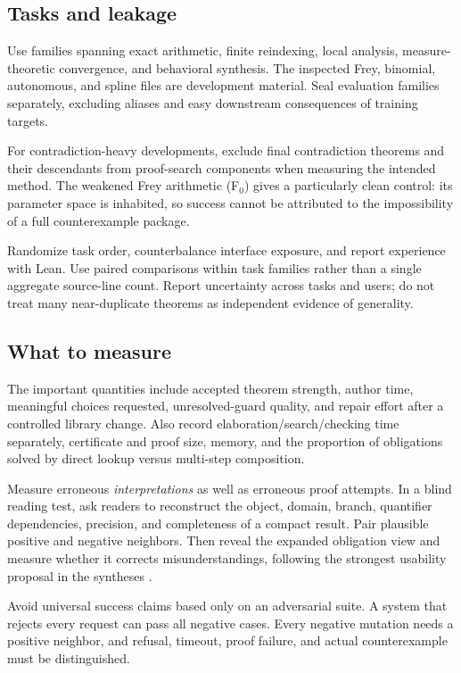 \documentclass[11pt,letterpaper]{article}
\theoremstyle{definition}\newtheorem{definition}[theorem]{Definition}
\begin{document}
\subsection{Tasks and leakage}
Use families spanning exact arithmetic, finite reindexing, local analysis, measure-theoretic convergence, and behavioral synthesis. The inspected Frey, binomial, autonomous, and spline files are development material. Seal evaluation families separately, excluding aliases and easy downstream consequences of training targets.

For contradiction-heavy developments, exclude final contradiction theorems and their descendants from proof-search components when measuring the intended method. The weakened Frey arithmetic (F$_0$) gives a particularly clean control: its parameter space is inhabited, so success cannot be attributed to the impossibility of a full counterexample package.

Randomize task order, counterbalance interface exposure, and report experience with Lean. Use paired comparisons within task families rather than a single aggregate source-line count. Report uncertainty across tasks and users; do not treat many near-duplicate theorems as independent evidence of generality.

\subsection{What to measure}
The important quantities include accepted theorem strength, author time, meaningful choices requested, unresolved-guard quality, and repair effort after a controlled library change. Also record elaboration/search/checking time separately, certificate and proof size, memory, and the proportion of obligations solved by direct lookup versus multi-step composition.

Measure erroneous \emph{interpretations} as well as erroneous proof attempts. In a blind reading test, ask readers to reconstruct the object, domain, branch, quantifier dependencies, precision, and completeness of a compact result. Pair plausible positive and negative neighbors. Then reveal the expanded obligation view and measure whether it corrects misunderstandings, following the strongest usability proposal in the syntheses \cite{reportA,reportB}.

Avoid universal success claims based only on an adversarial suite. A system that rejects every request can pass all negative cases. Every negative mutation needs a positive neighbor, and refusal, timeout, proof failure, and actual counterexample must be distinguished.
\end{document}
